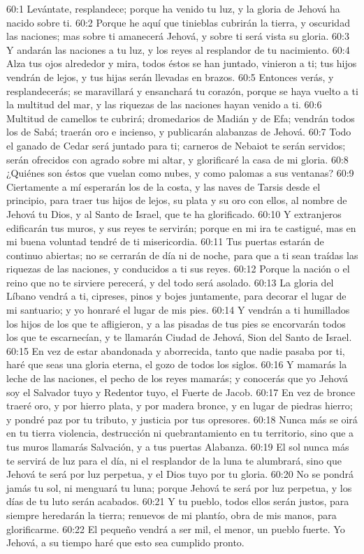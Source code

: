 60:1 Levántate, resplandece; porque ha venido tu luz, y la gloria de Jehová ha nacido sobre ti. 
60:2 Porque he aquí que tinieblas cubrirán la tierra, y oscuridad las naciones; mas sobre ti amanecerá Jehová, y sobre ti será vista su gloria. 
60:3 Y andarán las naciones a tu luz, y los reyes al resplandor de tu nacimiento. 
60:4 Alza tus ojos alrededor y mira, todos éstos se han juntado, vinieron a ti; tus hijos vendrán de lejos, y tus hijas serán llevadas en brazos. 
60:5 Entonces verás, y resplandecerás; se maravillará y ensanchará tu corazón, porque se haya vuelto a ti la multitud del mar, y las riquezas de las naciones hayan venido a ti. 
60:6 Multitud de camellos te cubrirá; dromedarios de Madián y de Efa; vendrán todos los de Sabá; traerán oro e incienso, y publicarán alabanzas de Jehová. 
60:7 Todo el ganado de Cedar será juntado para ti; carneros de Nebaiot te serán servidos; serán ofrecidos con agrado sobre mi altar, y glorificaré la casa de mi gloria. 
60:8 ¿Quiénes son éstos que vuelan como nubes, y como palomas a sus ventanas? 
60:9 Ciertamente a mí esperarán los de la costa, y las naves de Tarsis desde el principio, para traer tus hijos de lejos, su plata y su oro con ellos, al nombre de Jehová tu Dios, y al Santo de Israel, que te ha glorificado. 
60:10 Y extranjeros edificarán tus muros, y sus reyes te servirán; porque en mi ira te castigué, mas en mi buena voluntad tendré de ti misericordia. 
60:11 Tus puertas estarán de continuo abiertas; no se cerrarán de día ni de noche, para que a ti sean traídas las riquezas de las naciones, y conducidos a ti sus reyes. 
60:12 Porque la nación o el reino que no te sirviere perecerá, y del todo será asolado. 
60:13 La gloria del Líbano vendrá a ti, cipreses, pinos y bojes juntamente, para decorar el lugar de mi santuario; y yo honraré el lugar de mis pies. 
60:14 Y vendrán a ti humillados los hijos de los que te afligieron, y a las pisadas de tus pies se encorvarán todos los que te escarnecían, y te llamarán Ciudad de Jehová, Sion del Santo de Israel. 
60:15 En vez de estar abandonada y aborrecida, tanto que nadie pasaba por ti, haré que seas una gloria eterna, el gozo de todos los siglos. 
60:16 Y mamarás la leche de las naciones, el pecho de los reyes mamarás; y conocerás que yo Jehová soy el Salvador tuyo y Redentor tuyo, el Fuerte de Jacob. 
60:17 En vez de bronce traeré oro, y por hierro plata, y por madera bronce, y en lugar de piedras hierro; y pondré paz por tu tributo, y justicia por tus opresores. 
60:18 Nunca más se oirá en tu tierra violencia, destrucción ni quebrantamiento en tu territorio, sino que a tus muros llamarás Salvación, y a tus puertas Alabanza. 
60:19 El sol nunca más te servirá de luz para el día, ni el resplandor de la luna te alumbrará, sino que Jehová te será por luz perpetua, y el Dios tuyo por tu gloria. 
60:20 No se pondrá jamás tu sol, ni menguará tu luna; porque Jehová te será por luz perpetua, y los días de tu luto serán acabados. 
60:21 Y tu pueblo, todos ellos serán justos, para siempre heredarán la tierra; renuevos de mi plantío, obra de mis manos, para glorificarme. 
60:22 El pequeño vendrá a ser mil, el menor, un pueblo fuerte. Yo Jehová, a su tiempo haré que esto sea cumplido pronto. 
